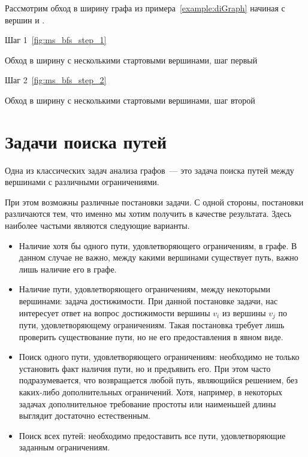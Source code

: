 \begin{example}
    Рассмотрим обход в ширину графа из примера~\ref{example:diGraph} начиная с вершин  и .

    Шаг 1~\ref{fig:ms_bfs_step_1}
    
\begin{marginfigure}
    \begin{center}
        \scalebox{0.8}{}
    \end{center}
    \caption{Обход в ширину с несколькими стартовыми вершинами, шаг первый}
    \label{fig:ms_bfs_step_1}
\end{marginfigure}

Шаг 2~\ref{fig:ms_bfs_step_2}
\begin{marginfigure}
    \begin{center}
        \scalebox{0.8}{}
    \end{center}
    \caption{Обход в ширину с несколькими стартовыми вершинами, шаг второй}
    \label{fig:ms_bfs_step_2}
\end{marginfigure}

\end{example}

\section{Задачи поиска путей}

Одна из классических задач анализа графов~--- это задача поиска путей между вершинами с различными ограничениями.

При этом возможны различные постановки задачи.
С одной стороны, постановки различаются тем, что именно мы хотим получить в качестве результата. Здесь наиболее частыми являются следующие варианты.

\begin{itemize}
    \item Наличие хотя бы одного пути, удовлетворяющего ограничениям, в графе.
          В данном случае не важно, между какими вершинами существует путь, важно лишь наличие его в графе.
    \item Наличие пути, удовлетворяющего ограничениям, между некоторыми вершинами: задача достижимости.
          При данной постановке задачи, нас интересует ответ на вопрос достижимости вершины $v_i$ из вершины $v_j$ по пути, удовлетворяющему ограничениям.
          Такая постановка требует лишь проверить существование пути, но не его предоставления в явном виде.
    \item Поиск одного пути, удовлетворяющего ограничениям: необходимо не только установить факт наличия пути, но и  предъявить его.
          При этом часто подразумевается, что возвращается любой путь, являющийся решением, без каких-либо дополнительных ограничений.
          Хотя, например, в некоторых задачах дополнительное требование простоты или наименьшей длины выглядит достаточно естественным.
    \item Поиск всех путей: необходимо предоставить все пути, удовлетворяющие заданным ограничениям.
\end{itemize}


